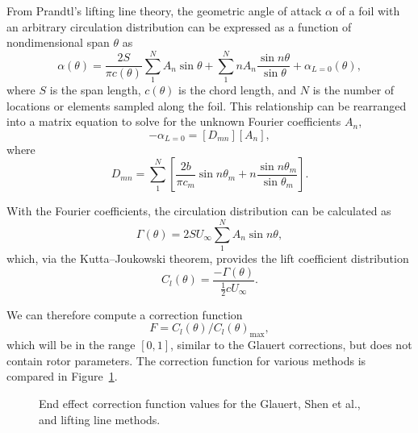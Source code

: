 From Prandtl's lifting line theory, the geometric angle of attack $\alpha$ of a
foil with an arbitrary circulation distribution can be expressed as a function
of nondimensional span $\theta$ as \cite{Anderson2001}
\begin{equation}
    \alpha (\theta) = \frac{2S}{\pi c (\theta)}
    \sum_1^N A_n \sin \theta
    + \sum_1^N n A_n \frac{\sin n \theta}{\sin \theta}
    + \alpha_{L = 0}(\theta),
    \label{eq:lifting-line}
\end{equation}
where $S$ is the span length, $c(\theta)$ is the chord length, and $N$ is the
number of locations or elements sampled along the foil. This relationship can be
rearranged into a matrix equation to solve for the unknown Fourier coefficients
$A_n$,
\begin{equation}
    [\alpha_m ] - \alpha_{L=0} = [D_{mn}][A_n],
\end{equation}
where
\begin{equation}
    D_{mn} = \sum_1^N \left[ \frac{2b}{\pi c_m} \sin n \theta_m + n \frac{\sin n
        \theta_m}{\sin \theta_m} \right].
\end{equation}

With the Fourier coefficients, the circulation distribution can be calculated as
\begin{equation}
    \Gamma (\theta) = 2SU_\infty \sum_1^N A_n \sin n \theta,
\end{equation}
which, via the Kutta--Joukowski theorem, provides the lift coefficient
distribution
\begin{equation}
    C_l(\theta) = \frac{-\Gamma (\theta)}{\frac{1}{2} c U_\infty}.
\end{equation}

We can therefore compute a correction function 
\begin{equation}
    F = C_l(\theta)/C_l(\theta)_{\max},
\end{equation}
which will be in the range $[0, 1]$, similar to the Glauert corrections, but
does not contain rotor parameters. The correction function for various methods
is compared in Figure~\ref{fig:end-effects}.

\begin{figure}
    \centering
    
    \caption{End effect correction function values for the Glauert, Shen et al.,
        and lifting line methods.}
    
    \label{fig:end-effects}
\end{figure}



